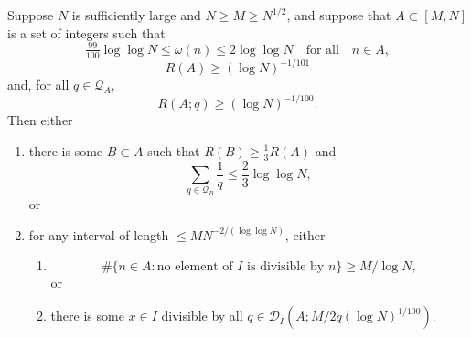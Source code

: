 \begin{proposition}\label{prop:tech_iterative}
  \leanok
Suppose $N$ is sufficiently large and $N\geq M\geq N^{1/2}$, and suppose that $A\subset [M,N]$ is a set of integers such that
\[\tfrac{99}{100}\log\log N\leq \omega(n)\leq  2\log\log N\quad\textrm{for all}\quad n\in A,\]
\[R(A)\geq (\log N)^{-1/101}\]
and, for all $q\in \mathcal{Q}_A$,
\[R(A;q) \geq (\log N)^{-1/100}.\]
Then either
\begin{enumerate}
\item there is some $B\subset A$ such that $R(B)\geq \tfrac{1}{3}R(A)$ and
\[\sum_{q\in \mathcal{Q}_{B}}\frac{1}{q}\leq \frac{2}{3}\log\log N,\]
or
\item for any interval of length $\leq MN^{-2/(\log \log N)}$, either
\begin{enumerate}
\item \[\# \{ n\in A : \textrm{no element of }I\textrm{ is divisible by }n\}\geq M/\log N,\]
or
\item there is some $x\in I$ divisible by all $q\in\mathcal{D}_I(A;M/2q(\log N)^{1/100})$.
\end{enumerate}
\end{enumerate}
\end{proposition}
